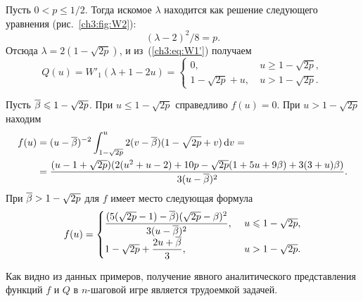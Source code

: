 {\begin{example}
  Пусть $0 < p \leq 1/2$.
  Тогда искомое $\lambda$ находится как решение следующего уравнения (\seename рис.~\ref{ch3:fig:W2}):
  \begin{equation*}
    (\lambda - 2)^2/8 = p.
  \end{equation*}
  Отсюда $\lambda = 2(1-\sqrt{2p})$, и из~(\ref{ch3:eq:W1'}) получаем
  \begin{equation*}
    Q(u) = W'_1(\lambda + 1 - 2u) = \begin{cases}
      0,\ & u \geq 1 - \sqrt{2p},\\
      1 - \sqrt{2p} + u,\ & u > 1 - \sqrt{2p}.
    \end{cases}
  \end{equation*}
  
  Пусть ${{\overline{\beta}}} \leqslant 1 - \sqrt{2p}$.
  При $u \leq 1 - \sqrt{2p}$ справедливо $f(u) = 0$.
  При $u > 1 - \sqrt{2p}$ находим
  \begin{align*}
    f(u) 
    &= (u-{{\overline{\beta}}})^{-2} \int_{1-\sqrt{2p}}^u 2 (v-{{\overline{\beta}}}) (1-\sqrt{2p}+v) \mathop{}\!\mathrm{d} v = \\
    &= \frac{(u - 1 + \sqrt{2p})(2(u^2 + u - 2) + 10p - \sqrt{2p}(1+5u+9\beta) + 3(3+u)\beta)}{3(u-{{\overline{\beta}}})^2}.
  \end{align*}
  При ${{\overline{\beta}}} > 1 - \sqrt{2p}$ для $f$ имеет место следующая формула
  \begin{equation*}
    f(u) =
    \begin{cases}
      {\displaystyle \frac{(5(\sqrt{2p}-1) - \ensuremath{{{\overline{\beta}}}})(\sqrt{2p} - \ensuremath{\beta})^2}{3(u - \ensuremath{{{\overline{\beta}}}})^2}},\ & u \leqslant 1 - \sqrt{2p}, \\
      1 - \sqrt{2p} + {\displaystyle \frac{2u + {{\overline{\beta}}}}{3}},\ & u > 1 - \sqrt{2p}.
    \end{cases}
  \end{equation*}
\end{example}

Как видно из данных примеров, получение явного аналитического представления функций $f$ и $Q$ в $n$-шаговой игре является трудоемкой задачей.
}


